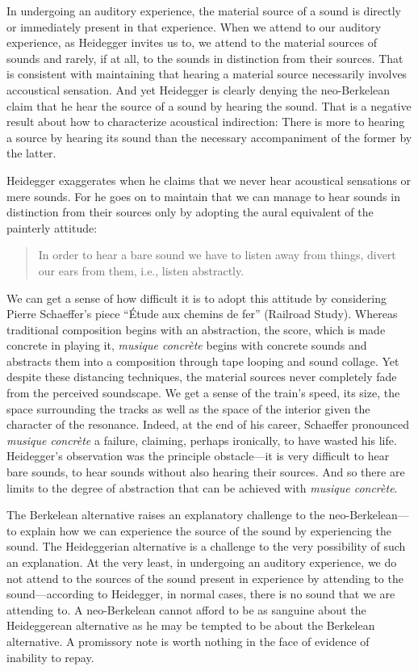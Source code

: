 \documentclass[12pt]{article}
\begin{document}
In undergoing an auditory experience, the material source of a sound is directly or immediately present in that experience. When we attend to our auditory experience, as Heidegger invites us to, we attend to the material sources of sounds and rarely, if at all, to the sounds in distinction from their sources. That is consistent with maintaining that hearing a material source necessarily involves accoustical sensation. And yet Heidegger is clearly denying the neo-Berkelean claim that he hear the source of a sound by hearing the sound. That is a negative result about how to characterize acoustical indirection: There is more to hearing a source by hearing its sound than the necessary accompaniment of the former by the latter.

Heidegger exaggerates when he claims that we never hear acoustical sensations or mere sounds. For he goes on to maintain that we can manage to hear sounds in distinction from their sources only by adopting the aural equivalent of the painterly attitude:
\begin{quote}
    In order to hear a bare sound we have to listen away from things, divert our ears from them, i.e., listen abstractly. \citep[152]{Heidegger:1935uq}
\end{quote}
We can get a sense of how difficult it is to adopt this attitude by considering Pierre Schaeffer's piece ``Étude aux chemins de fer'' (Railroad Study). Whereas traditional composition begins with an abstraction, the score, which is made concrete in playing it, \emph{musique concrète} begins with concrete sounds and abstracts them into a composition through tape looping and sound collage. Yet despite these distancing techniques, the material sources never completely fade from the perceived soundscape. We get a sense of the train's speed, its size, the space surrounding the tracks as well as the space of the interior given the character of the resonance. Indeed, at the end of his career, Schaeffer pronounced \emph{musique concrète} a failure, claiming, perhaps ironically, to have wasted his life. Heidegger's observation was the principle obstacle---it is very difficult to hear bare sounds, to hear sounds without also hearing their sources. And so there are limits to the degree of abstraction that can be achieved with \emph{musique concrète}.

The Berkelean alternative raises an explanatory challenge to the neo-Berkelean---\-to explain how we can experience the source of the sound by experiencing the sound. The Heideggerian alternative is a challenge to the very possibility of such an explanation. At the very least, in undergoing an auditory experience, we do not attend to the sources of the sound present in experience by attending to the sound---according to Heidegger, in normal cases, there is no sound that we are attending to. A neo-Berkelean cannot afford to be as sanguine about the Heideggerean alternative as he may be tempted to be about the Berkelean alternative. A promissory note is worth nothing in the face of evidence of inability to repay.
\end{document}
